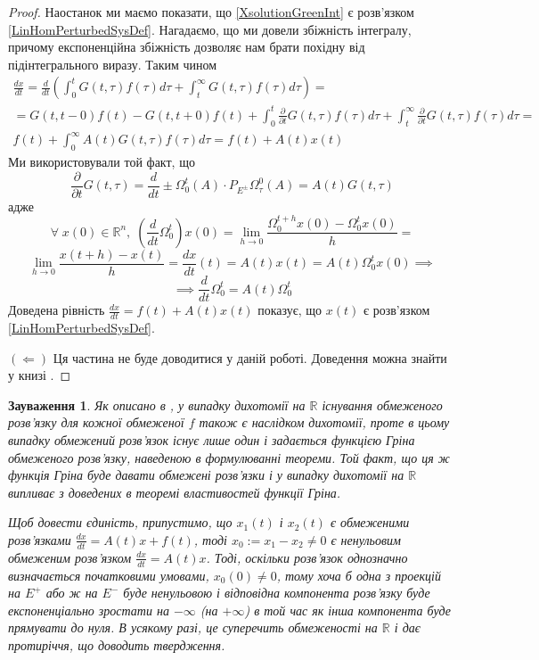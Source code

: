 \documentclass[14pt]{extarticle} %
\let\oldforall\forall
\renewcommand{\forall}{\oldforall\;}
\newtheorem{remark}{Зауваження}
\begin{document}
\begin{proof}
	Наостанок ми маємо показати, що \ref{XsolutionGreenInt} є розв’язком \ref{LinHomPerturbedSysDef}. Нагадаємо, що ми довели збіжність
	інтегралу, причому експоненційна збіжність дозволяє нам брати похідну від підінтегрального виразу. Таким чином
	\begin{gather*}
		\frac{dx}{dt}=\frac{d}{dt}(\int_0^tG(t,\tau)f(\tau)d\tau+\int_t^{\infty}G(t,\tau)f(\tau)d\tau)=\\
		=G(t,t-0)f(t)-G(t,t+0)f(t)+\int_0^t\frac{\partial}{\partial t}G(t,\tau)f(\tau)d\tau+
		\int_t^{\infty}\frac{\partial}{\partial t}G(t,\tau)f(\tau)d\tau=\\
		f(t)+\int_0^{\infty}A(t)G(t,\tau)f(\tau)d\tau=f(t)+A(t)x(t)
	\end{gather*}
	Ми використовували той факт, що
	\[\frac{\partial}{\partial t}G(t,\tau)=\frac{d}{d t}\pm\Omega_0^t(A)\cdot P_{E^{\pm}}\Omega_{\tau}^0(A)=A(t)G(t,\tau)\]
	адже \[\forall x(0)\in\mathbb{R}^n,\;(\frac{d}{dt}\Omega_0^t)x(0)=\lim_{h\to 0}\frac{\Omega_0^{t+h}x(0)-\Omega_0^tx(0)}{h}=\]
	\[\lim_{h\to 0}\frac{x(t+h)-x(t)}{h}=\frac{dx}{dt}(t)=A(t)x(t)=A(t)\Omega_0^tx(0)\implies\]
	\[\implies\frac{d}{dt}\Omega_0^t=A(t)\Omega_0^t\]
	Доведена рівність $\frac{dx}{dt}=f(t)+A(t)x(t)$ показує, що $x(t)$ є розв’язком \ref{LinHomPerturbedSysDef}.

	$(\Longleftarrow)$ Ця частина не буде доводитися у даній роботі. Доведення можна знайти у книзі \cite{krein}.
\end{proof}
\begin{remark}
	Як описано в \cite{mitrop},
	у випадку дихотомії на $\mathbb{R}$ існування обмеженого розв’язку для кожної обмеженої $f$ також є наслідком дихотомії, проте в цьому 
	випадку обмежений розв’язок існує лише один і задається функцією Гріна обмеженого розв’язку, наведеною в формулюванні теореми. Той факт,
	що ця ж функція Гріна буде давати обмежені розв’язки і у випадку дихотомії на $\mathbb{R}$ випливає з доведених в теоремі
	властивостей функції Гріна.

	Щоб довести єдиність, припустимо, що $x_1(t)$ і $x_2(t)$ є обмеженими розв’язками $\frac{dx}{dt}=A(t)x+f(t)$, тоді
	$x_0:=x_1-x_2\neq 0$ є ненульовим обмеженим розв’язком $\frac{dx}{dt}=A(t)x$. Тоді, оскільки розв’язок однозначно визначається
	початковими умовами, $x_0(0)\neq 0$, тому хоча б одна з проекцій на $E^+$ або ж на $E^-$ буде ненульовою і відповідна компонента
	розв’язку буде експоненціально зростати на $-\infty$ (на $+\infty$) в той час як інша компонента буде прямувати до нуля. В усякому разі,
	це суперечить обмеженості на $\mathbb{R}$ і дає протиріччя, що доводить твердження.
\end{remark}
\end{document}
